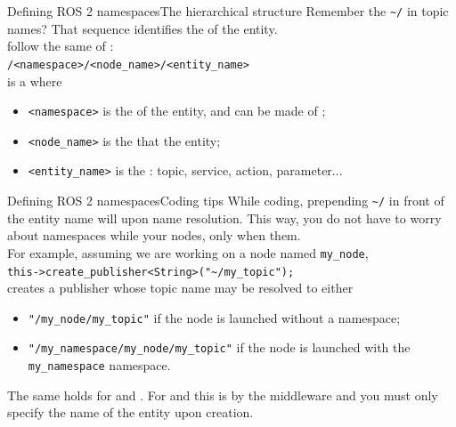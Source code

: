 \begin{frame}{Defining ROS 2 namespaces}{The hierarchical structure}
  \justifying
  Remember the \texttt{\textasciitilde/} in topic names? That sequence identifies the  of the entity.\\
   follow the same  of :\\
  \bigskip
  \texttt{/<namespace>/<node\_name>/<entity\_name>}\\
  \bigskip
  is a  where
  \begin{itemize}
    \item \texttt{<namespace>} is the  of the entity, and can be made of ;
    \item \texttt{<node\_name>} is the  that  the entity;
    \item \texttt{<entity\_name>} is the : topic, service, action, parameter...
  \end{itemize}
\end{frame}
\begin{frame}{Defining ROS 2 namespaces}{Coding tips}
  \justifying
  While coding, prepending \texttt{\textasciitilde/} in front of the entity name will  upon name resolution. This way, you do not have to worry about namespaces while  your nodes, only when  them.\\
  For example, assuming we are working on a node named \texttt{my\_node},\\
  \bigskip
  \texttt{this->create\_publisher<String>("\textasciitilde/my\_topic");}\\
  \bigskip
  creates a publisher whose topic name may be resolved to either
  \begin{itemize}
    \item \texttt{"/my\_node/my\_topic"} if the node is launched without a namespace;
    \item \texttt{"/my\_namespace/my\_node/my\_topic"} if the node is launched with the \texttt{my\_namespace} namespace.
  \end{itemize}
  The same holds for  and . For  and  this is  by the middleware and you must only specify the name of the entity upon creation.
\end{frame}
